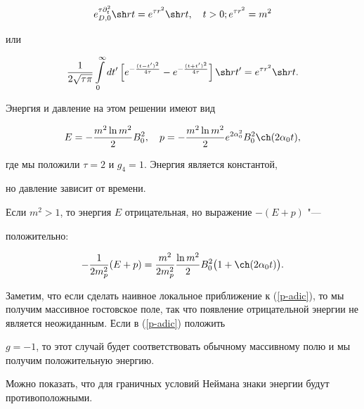 \begin{equation*}


e^{\tau\partial^2_t}_{D,0}\sh  rt=e^{\tau r^2}\sh  rt, \quad t>0; e^{\tau r^2}=m^2

\end{equation*}

или

$$

\frac{1}{2\sqrt{\tau\pi} } \int\limits_0^\infty

dt'\,\Bigl[e^{-\frac{(t-t')^2}{4\tau}}-e^{-\frac{(t+t')^2}{4\tau}}\Bigr]\,

\sh  rt'=e^{\tau r^2}\sh  rt.

$$



Энергия и давление на этом решении имеют вид \cite{AJV:2007a}

$$

E=-\frac{m^2\ln m^2}{2} { B}^2_0,\quad 

p=-\frac{m^2\ln m^2}{2}e ^{2\alpha_0^2}{ B}^2_0\ch  (2\alpha _0t),

$$

где мы положили $\tau=2$ и $g_4=1$. Энергия является константой,

но давление зависит от времени.

Если $m^2>1$, то энергия $E$ отрицательная, но выражение $-(E+p)$ "---

положительно:

\begin{equation*}

-\frac{1}{2m_p^2}(E+p)=

\frac{m^2}{2m_p^2}\frac{\ln m^2}{2}{ B}^2_0\bigl(1+\ch  (2\alpha _0t)\bigr).

\end{equation*}

Заметим, что если сделать наивное локальное приближение к (\ref{p-adic}), то мы получим массивное гостовское поле, так что появление отрицательной энергии не является неожиданным. Если в  (\ref{p-adic}) положить

$g=-1$, то этот случай  будет соответствовать обычному массивному полю и мы  получим положительную энергию.



Можно показать, что для граничных условий Неймана знаки энергии будут противоположными.



\smallskip

